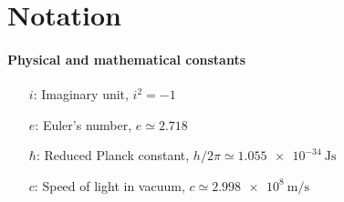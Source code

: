 \chapter{Notation}
\subsubsection{Physical and mathematical constants}
    \begin{enumerate}
        \item[$i$:] Imaginary unit, $i^2 = -1$
        \item[$e$:] Euler's number, $e\simeq\num{2.718}$
        \item[$\hbar$:] Reduced Planck constant, $h/2\pi \simeq \SI{1.055e-34}{\joule\second}$ 
        \item[$c$:] Speed of light in vacuum, $c\simeq\SI{2.998e+8}{\meter\per\second}$ 
    \end{enumerate}
